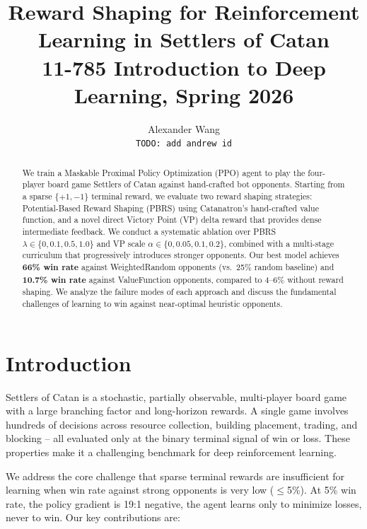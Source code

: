 \documentclass[10pt,twocolumn]{article}
\title{\textbf{Reward Shaping for Reinforcement Learning in Settlers of Catan}\\
\large 11-785 Introduction to Deep Learning, Spring 2026}
\author{Alexander Wang\\
\texttt{TODO: add andrew id}}
\date{}
\begin{document}
\maketitle

\begin{abstract}
We train a Maskable Proximal Policy Optimization (PPO) agent to play the
four-player board game Settlers of Catan against hand-crafted bot opponents.
Starting from a sparse $\{+1, -1\}$ terminal reward, we evaluate two reward
shaping strategies: Potential-Based Reward Shaping (PBRS) using Catanatron's
hand-crafted value function, and a novel direct Victory Point (VP) delta
reward that provides dense intermediate feedback. We conduct a systematic
ablation over PBRS $\lambda \in \{0, 0.1, 0.5, 1.0\}$ and VP scale
$\alpha \in \{0, 0.05, 0.1, 0.2\}$, combined with a multi-stage curriculum
that progressively introduces stronger opponents. Our best model achieves
\textbf{66\% win rate} against WeightedRandom opponents (vs.\ 25\% random
baseline) and \textbf{10.7\% win rate} against ValueFunction opponents,
compared to 4--6\% without reward shaping. We analyze the failure modes of
each approach and discuss the fundamental challenges of learning to win against
near-optimal heuristic opponents.
\end{abstract}

\section{Introduction}

Settlers of Catan is a stochastic, partially observable, multi-player board game
with a large branching factor and long-horizon rewards. A single game involves
hundreds of decisions across resource collection, building placement, trading,
and blocking -- all evaluated only at the binary terminal signal of win or loss.
These properties make it a challenging benchmark for deep reinforcement learning.

We address the core challenge that sparse terminal rewards are insufficient for
learning when win rate against strong opponents is very low ($\leq$5\%).
At 5\% win rate, the policy gradient is 19:1 negative, the agent learns only to
minimize losses, never to win. Our key contributions are:
\end{document}
